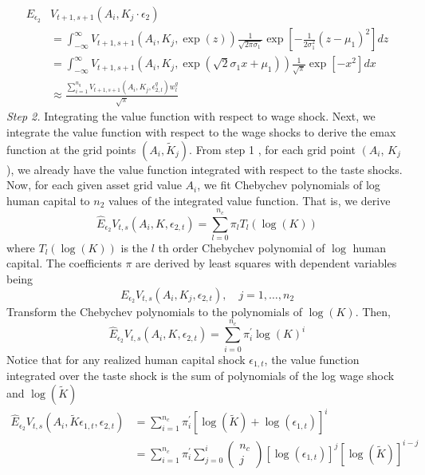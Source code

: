 \documentclass{article}
\begin{document}
$$
\begin{aligned}
E_{\epsilon_2} & V_{t+1, s+1}\left(A_i, K_j \cdot \epsilon_2\right) \\
&=\int_{-\infty}^{\infty} V_{t+1, s+1}\left(A_i, K_j, \exp (z)\right) \frac{1}{\sqrt{2 \pi \sigma_1}} \exp \left[-\frac{1}{2 \sigma_1^2}\left(z-\mu_1\right)^2\right] d z \\
&=\int_{-\infty}^{\infty} V_{t+1, s+1}\left(A_i, K_j, \exp \left(\sqrt{2} \sigma_1 x+\mu_1\right)\right) \frac{1}{\sqrt{\pi}} \exp \left[-x^2\right] d x \\
& \approx \frac{\sum_{i=1}^{n_q} V_{t+1, s+1}\left(A_i, K_j, \epsilon_{2, l}^q\right) w_l^q}{\sqrt{\pi}}
\end{aligned}
$$
\textit{Step 2.}      Integrating the value function with respect to wage shock. Next, we integrate the value function with respect to the wage shocks to derive the emax function at the grid points $\left(A_i, \tilde{K}_j\right)$. From step 1 , for each grid point $\left(A_i\right.$, $K_j$ ), we already have the value function integrated with respect to the taste shocks. Now, for each given asset grid value $A_i$, we fit Chebychev polynomials of log human capital to $n_2$ values of the integrated value function. That is, we derive
$$
\hat{E}_{\epsilon_2} V_{t, s}\left(A_i, K, \epsilon_{2, t}\right)=\sum_{l=0}^{n_c} \pi_l T_l(\log (K))
$$
where $T_l(\log (K))$ is the $l$ th order Chebychev polynomial of $\log$ human capital. The coefficients $\pi$ are derived by least squares with dependent variables being
$$
E_{\epsilon_2} V_{t, s}\left(A_i, K_j, \epsilon_{2, t}\right), \quad j=1, \ldots, n_2
$$
Transform the Chebychev polynomials to the polynomials of $\log (K)$. Then,
$$
\hat{E}_{\epsilon_2} V_{t, s}\left(A_i, K, \epsilon_{2, t}\right)=\sum_{i=0}^{n_c} \pi_i^{\prime} \log (K)^i
$$
Notice that for any realized human capital shock $\epsilon_{1, t}$, the value function integrated over the taste shock is the sum of polynomials of the log wage shock and $\log (\tilde{K})$
$$
\begin{aligned}
\hat{E}_{\epsilon_2} V_{t, s}\left(A_i, \tilde{K} \epsilon_{1, t}, \epsilon_{2, t}\right) &=\sum_{i=1}^{n_c} \pi_i^{\prime}\left[\log (\tilde{K})+\log \left(\epsilon_{1, t}\right)\right]^i \\
&=\sum_{i=1}^{n_c} \pi_i^{\prime} \sum_{j=0}^i\left(\begin{array}{c}
n_c \\
j
\end{array}\right)\left[\log \left(\epsilon_{1, t}\right)\right]^j[\log (\tilde{K})]^{i-j}
\end{aligned}
$$
\end{document}
